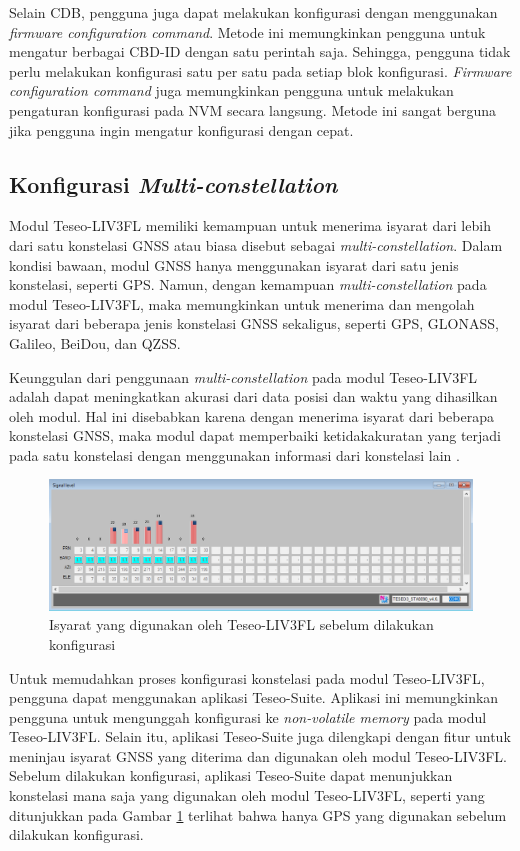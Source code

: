 Selain CDB, pengguna juga dapat melakukan konfigurasi dengan menggunakan \textit{firmware configuration command}. Metode ini memungkinkan pengguna untuk mengatur berbagai CBD-ID dengan satu perintah saja. Sehingga, pengguna tidak perlu melakukan konfigurasi satu per satu pada setiap blok konfigurasi. \textit{Firmware configuration command} juga memungkinkan pengguna untuk melakukan pengaturan konfigurasi pada NVM secara langsung. Metode ini sangat berguna jika pengguna ingin mengatur konfigurasi dengan cepat.

\subsection{Konfigurasi \textit{Multi-constellation}}
Modul Teseo\hyp{}LIV3FL memiliki kemampuan untuk menerima isyarat dari lebih dari satu konstelasi GNSS atau biasa disebut sebagai \textit{multi-constellation}. Dalam kondisi bawaan, modul GNSS hanya menggunakan isyarat dari satu jenis konstelasi, seperti GPS. Namun, dengan kemampuan \textit{multi-constellation} pada modul Teseo\hyp{}LIV3FL, maka memungkinkan untuk menerima dan mengolah isyarat dari beberapa jenis konstelasi GNSS sekaligus, seperti GPS, GLONASS, Galileo, BeiDou, dan QZSS.
 
Keunggulan dari penggunaan \textit{multi-constellation} pada modul Teseo\hyp{}LIV3FL adalah dapat meningkatkan akurasi dari data posisi dan waktu yang dihasilkan oleh modul. Hal ini disebabkan karena dengan menerima isyarat dari beberapa konstelasi GNSS, maka modul dapat memperbaiki ketidakakuratan yang terjadi pada satu konstelasi dengan menggunakan informasi dari konstelasi lain \cite{An2020}.
 
\begin{figure}[H]
	\centering
	\includegraphics[width=14cm]{contents/chapter-3/setting-konstelasi/sebelum-konfigurasi.png}
	\caption{Isyarat yang digunakan oleh Teseo\hyp{}LIV3FL sebelum dilakukan konfigurasi}
	\label{Fig: sebelum-konfigurasi}
\end{figure}

 Untuk memudahkan proses konfigurasi konstelasi pada modul Teseo\hyp{}LIV3FL, pengguna dapat menggunakan aplikasi Teseo-Suite. Aplikasi ini memungkinkan pengguna untuk mengunggah konfigurasi ke \textit{non-volatile memory} pada modul Teseo\hyp{}LIV3FL. Selain itu, aplikasi Teseo-Suite juga dilengkapi dengan fitur untuk meninjau isyarat GNSS yang diterima dan digunakan oleh modul Teseo\hyp{}LIV3FL. Sebelum dilakukan konfigurasi, aplikasi Teseo-Suite dapat menunjukkan konstelasi mana saja yang digunakan oleh modul Teseo\hyp{}LIV3FL, seperti yang ditunjukkan pada Gambar \ref{Fig: sebelum-konfigurasi} terlihat bahwa hanya GPS yang digunakan sebelum dilakukan konfigurasi.
 

